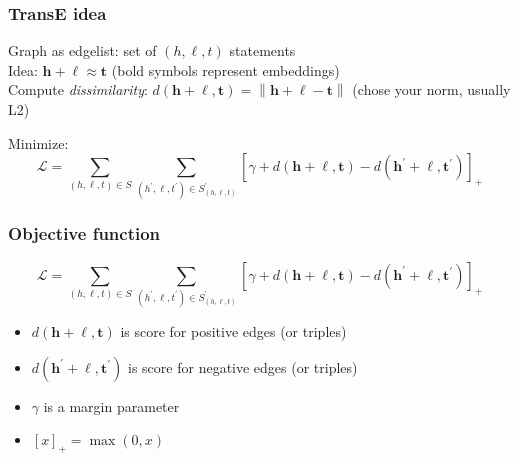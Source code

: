 \documentclass{beamer}
\newcommand{\norm}[1]{\left\lVert#1\right\rVert}
\begin{document}
\begin{frame}
  \frametitle{TransE idea}

  \pause
  Graph as edgelist: set of $(h,\ell,t)$ statements\\
  \pause
  Idea: $\boldsymbol{h} + \boldsymbol{\ell} \approx \boldsymbol{t}$ (bold symbols represent embeddings)\\
  \pause
  Compute \textit{dissimilarity}: $d(\boldsymbol{h}+\boldsymbol{\ell}, \boldsymbol{t}) = \norm{\boldsymbol{h} + \boldsymbol{\ell} - \boldsymbol{t} }$ (chose your norm, usually L2)
  \pause
  
  Minimize: $$\mathcal{L}=\sum_{(h, \ell, t) \in S} \sum_{\left(h^{\prime}, \ell, t^{\prime}\right) \in S_{(h, \ell, t)}^{\prime}}\left[\gamma+d(\boldsymbol{h}+\boldsymbol{\ell}, \boldsymbol{t})-d\left(\boldsymbol{h}^{\prime}+\boldsymbol{\ell}, \boldsymbol{t}^{\prime}\right)\right]_{+}$$

\end{frame}

\begin{frame}
  \frametitle{Objective function}

  $$\mathcal{L}=\sum_{(h, \ell, t) \in S} \sum_{\left(h^{\prime}, \ell, t^{\prime}\right) \in S_{(h, \ell, t)}^{\prime}}\left[\gamma+d(\boldsymbol{h}+\boldsymbol{\ell}, \boldsymbol{t})-d\left(\boldsymbol{h}^{\prime}+\boldsymbol{\ell}, \boldsymbol{t}^{\prime}\right)\right]_{+}$$

  \begin{itemize}
    \pause
  \item $d(\boldsymbol{h}+\boldsymbol{\ell}, \boldsymbol{t})$ is score for positive edges (or triples)
    \pause
  \item $d\left(\boldsymbol{h}^{\prime}+\boldsymbol{\ell}, \boldsymbol{t}^{\prime}\right)$ is score for negative edges (or triples)
    \pause
  \item $\gamma$ is a margin parameter
    \pause
  \item $\left[ x \right]_+ = \max(0, x)$  
  \end{itemize}
  
\end{frame}
\end{document}
